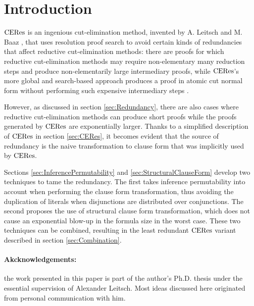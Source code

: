 \section{Introduction}

$\mathrm{CERes}$ is an ingenious cut-elimination method, invented by A. Leitsch and M. Baaz \cite{BaazLeitsch1999MethodsofCut-Elimination,BaazLeitsch2000Cut-eliminationandRedundancy-eliminationbyResolution,BaazLeitsch2006Towardsaclausalanalysisofcut-elimination}, that uses resolution proof search to avoid certain kinds of redundancies that affect reductive cut-elimination methods: there are proofs for which reductive cut-elimination methods may require non-elementary many reduction steps and produce non-elementarily large intermediary proofs, while $\mathrm{CERes}$'s more global and search-based approach produces a proof in atomic cut normal form without performing such expensive intermediary steps \cite{BaazLeitsch2009MethodsofCut-Elimination}. 

However, as discussed in section \ref{sec:Redundancy}, there are also cases where reductive cut-elimination methods can produce short proofs while the proofs generated by $\mathrm{CERes}$ are exponentially larger. Thanks to a simplified description of $\mathrm{CERes}$ in section \ref{sec:CERes}, it becomes evident that the source of redundancy is the naive transformation to clause form that was implicitly used by $\mathrm{CERes}$.

Sections \ref{sec:InferencePermutability} and \ref{sec:StructuralClauseForm} develop two techniques to tame the redundancy. The first takes inference permutability into account when performing the clause form transformation, thus avoiding the duplication of literals when disjunctions are distributed over conjunctions. The second proposes the use of structural clause form transformation, which does not cause an exponential blow-up in the formula size in the worst case. These two techniques can be combined, resulting in the least redundant $\mathrm{CERes}$ variant described in section \ref{sec:Combination}.

\paragraph{Akcknowledgements:} the work presented in this paper is part of the author's Ph.D. thesis \cite{Woltzenlogel-Paleo2009A-General-Analysis-of-Cut-Elimination-by-CERes} under the essential supervision of Alexander Leitsch. Most ideas discussed here originated from personal communication with him.
